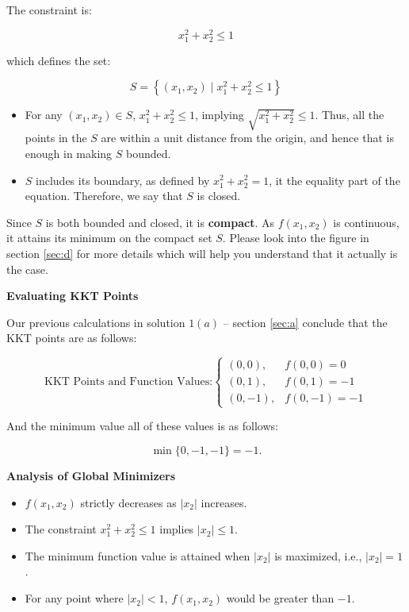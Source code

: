 \documentclass{article}
\begin{document}
The constraint is:

\begin{equation}
x_1^2 + x_2^2 \leq 1
\end{equation}

which defines the set:

\begin{equation}
S = \left\{ (x_1, x_2) \mid x_1^2 + x_2^2 \leq 1 \right\}
\end{equation}


\begin{itemize}
    \item For any $(x_1, x_2) \in S$, $x_1^2 + x_2^2 \leq 1$, implying $\sqrt{x_1^2 + x_2^2} \leq 1$. Thus, all the points in  the $S$ are within a unit distance from the origin, and hence that is enough in making $S$ bounded.
    \item $S$ includes its boundary, as defined by $x_1^2 + x_2^2 = 1$, it the equality part of the equation. Therefore, we say that $S$ is closed.
\end{itemize}

Since $S$ is both bounded and closed, it is \textbf{compact}. As $f(x_1, x_2)$ is continuous, it attains its minimum on the compact set $S$. Please look into the figure in section \ref{sec:d} for more details which will help you understand that it actually is the case.

\textbf{Evaluating KKT Points}

Our previous calculations in solution $1(a)$ -- section \ref{sec:a} conclude that the KKT points are as follows:

\begin{equation}
\text{KKT Points and Function Values:}
\begin{cases}
(0, 0), & f(0, 0) = 0 \\
(0, 1), & f(0, 1) = -1 \\
(0, -1), & f(0, -1) = -1
\end{cases}
\end{equation}

And the minimum value all of these values is as follows:

\begin{equation}
\min\{ 0, -1, -1 \} = -1.
\end{equation}

\textbf{Analysis of Global Minimizers}

\begin{itemize}
    \item $f(x_1, x_2)$ strictly decreases as $|x_2|$ increases.
    \item The constraint $x_1^2 + x_2^2 \leq 1$ implies $|x_2| \leq 1$.
    \item The minimum function value is attained when $|x_2|$ is maximized, i.e., $|x_2| = 1$.
    \item For any point where $|x_2| < 1$, $f(x_1, x_2)$ would be greater than $-1$.
\end{itemize}
\end{document}
